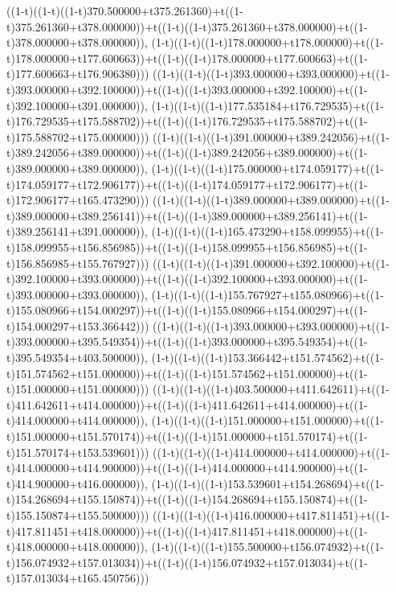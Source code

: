 ((1-t)((1-t)((1-t)370.500000+t375.261360)+t((1-t)375.261360+t378.000000))+t((1-t)((1-t)375.261360+t378.000000)+t((1-t)378.000000+t378.000000)),                                     (1-t)((1-t)((1-t)178.000000+t178.000000)+t((1-t)178.000000+t177.600663))+t((1-t)((1-t)178.000000+t177.600663)+t((1-t)177.600663+t176.906380)))
((1-t)((1-t)((1-t)393.000000+t393.000000)+t((1-t)393.000000+t392.100000))+t((1-t)((1-t)393.000000+t392.100000)+t((1-t)392.100000+t391.000000)),                                     (1-t)((1-t)((1-t)177.535184+t176.729535)+t((1-t)176.729535+t175.588702))+t((1-t)((1-t)176.729535+t175.588702)+t((1-t)175.588702+t175.000000)))
((1-t)((1-t)((1-t)391.000000+t389.242056)+t((1-t)389.242056+t389.000000))+t((1-t)((1-t)389.242056+t389.000000)+t((1-t)389.000000+t389.000000)),                                     (1-t)((1-t)((1-t)175.000000+t174.059177)+t((1-t)174.059177+t172.906177))+t((1-t)((1-t)174.059177+t172.906177)+t((1-t)172.906177+t165.473290)))
((1-t)((1-t)((1-t)389.000000+t389.000000)+t((1-t)389.000000+t389.256141))+t((1-t)((1-t)389.000000+t389.256141)+t((1-t)389.256141+t391.000000)),                                     (1-t)((1-t)((1-t)165.473290+t158.099955)+t((1-t)158.099955+t156.856985))+t((1-t)((1-t)158.099955+t156.856985)+t((1-t)156.856985+t155.767927)))
((1-t)((1-t)((1-t)391.000000+t392.100000)+t((1-t)392.100000+t393.000000))+t((1-t)((1-t)392.100000+t393.000000)+t((1-t)393.000000+t393.000000)),                                     (1-t)((1-t)((1-t)155.767927+t155.080966)+t((1-t)155.080966+t154.000297))+t((1-t)((1-t)155.080966+t154.000297)+t((1-t)154.000297+t153.366442)))
((1-t)((1-t)((1-t)393.000000+t393.000000)+t((1-t)393.000000+t395.549354))+t((1-t)((1-t)393.000000+t395.549354)+t((1-t)395.549354+t403.500000)),                                     (1-t)((1-t)((1-t)153.366442+t151.574562)+t((1-t)151.574562+t151.000000))+t((1-t)((1-t)151.574562+t151.000000)+t((1-t)151.000000+t151.000000)))
((1-t)((1-t)((1-t)403.500000+t411.642611)+t((1-t)411.642611+t414.000000))+t((1-t)((1-t)411.642611+t414.000000)+t((1-t)414.000000+t414.000000)),                                     (1-t)((1-t)((1-t)151.000000+t151.000000)+t((1-t)151.000000+t151.570174))+t((1-t)((1-t)151.000000+t151.570174)+t((1-t)151.570174+t153.539601)))
((1-t)((1-t)((1-t)414.000000+t414.000000)+t((1-t)414.000000+t414.900000))+t((1-t)((1-t)414.000000+t414.900000)+t((1-t)414.900000+t416.000000)),                                     (1-t)((1-t)((1-t)153.539601+t154.268694)+t((1-t)154.268694+t155.150874))+t((1-t)((1-t)154.268694+t155.150874)+t((1-t)155.150874+t155.500000)))
((1-t)((1-t)((1-t)416.000000+t417.811451)+t((1-t)417.811451+t418.000000))+t((1-t)((1-t)417.811451+t418.000000)+t((1-t)418.000000+t418.000000)),                                     (1-t)((1-t)((1-t)155.500000+t156.074932)+t((1-t)156.074932+t157.013034))+t((1-t)((1-t)156.074932+t157.013034)+t((1-t)157.013034+t165.450756)))
